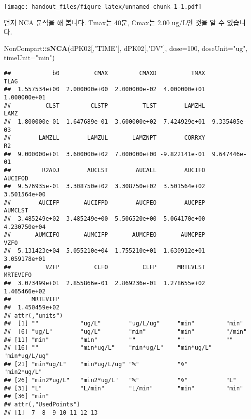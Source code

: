 \documentclass[9pt,]{krantz}
\newenvironment{Shaded}{\begin{snugshade}}{\end{snugshade}}
\newcommand{\KeywordTok}[1]{\textcolor[rgb]{0.13,0.29,0.53}{\textbf{#1}}}
\newcommand{\DataTypeTok}[1]{\textcolor[rgb]{0.13,0.29,0.53}{#1}}
\newcommand{\DecValTok}[1]{\textcolor[rgb]{0.00,0.00,0.81}{#1}}
\newcommand{\StringTok}[1]{\textcolor[rgb]{0.31,0.60,0.02}{#1}}
\newcommand{\OperatorTok}[1]{\textcolor[rgb]{0.81,0.36,0.00}{\textbf{#1}}}
\newcommand{\NormalTok}[1]{#1}
\begin{document}
\texttt{[image: handout\_files/figure-latex/unnamed-chunk-1-1.pdf]}

먼저 NCA 분석을 해 봅니다. Tmax는 40분, Cmax는 2.00 ug/L인 것을 알 수
있습니다.

\begin{Shaded}
\begin{Highlighting}[]
\NormalTok{NonCompart}\OperatorTok{::}\KeywordTok{sNCA}\NormalTok{(dPK02[,}\StringTok{"TIME"}\NormalTok{], dPK02[,}\StringTok{"DV"}\NormalTok{], }\DataTypeTok{dose=}\DecValTok{100}\NormalTok{, }\DataTypeTok{doseUnit=}\StringTok{"ug"}\NormalTok{, }\DataTypeTok{timeUnit=}\StringTok{"min"}\NormalTok{)}
\end{Highlighting}
\end{Shaded}

\begin{verbatim}
##            b0          CMAX         CMAXD          TMAX          TLAG 
##  1.557534e+00  2.000000e+00  2.000000e-02  4.000000e+01  1.000000e+01 
##          CLST         CLSTP          TLST        LAMZHL          LAMZ 
##  1.800000e-01  1.647689e-01  3.600000e+02  7.424929e+01  9.335405e-03 
##        LAMZLL        LAMZUL       LAMZNPT        CORRXY            R2 
##  9.000000e+01  3.600000e+02  7.000000e+00 -9.822141e-01  9.647446e-01 
##         R2ADJ        AUCLST        AUCALL        AUCIFO       AUCIFOD 
##  9.576935e-01  3.308750e+02  3.308750e+02  3.501564e+02  3.501564e+00 
##        AUCIFP       AUCIFPD        AUCPEO        AUCPEP       AUMCLST 
##  3.485249e+02  3.485249e+00  5.506520e+00  5.064170e+00  4.230750e+04 
##       AUMCIFO       AUMCIFP       AUMCPEO       AUMCPEP          VZFO 
##  5.131423e+04  5.055210e+04  1.755210e+01  1.630912e+01  3.059178e+01 
##          VZFP          CLFO          CLFP      MRTEVLST      MRTEVIFO 
##  3.073499e+01  2.855866e-01  2.869236e-01  1.278655e+02  1.465466e+02 
##      MRTEVIFP 
##  1.450459e+02 
## attr(,"units")
##  [1] ""            "ug/L"        "ug/L/ug"     "min"         "min"        
##  [6] "ug/L"        "ug/L"        "min"         "min"         "/min"       
## [11] "min"         "min"         ""            ""            ""           
## [16] ""            "min*ug/L"    "min*ug/L"    "min*ug/L"    "min*ug/L/ug"
## [21] "min*ug/L"    "min*ug/L/ug" "%"           "%"           "min2*ug/L"  
## [26] "min2*ug/L"   "min2*ug/L"   "%"           "%"           "L"          
## [31] "L"           "L/min"       "L/min"       "min"         "min"        
## [36] "min"        
## attr(,"UsedPoints")
## [1]  7  8  9 10 11 12 13
\end{verbatim}
\end{document}
